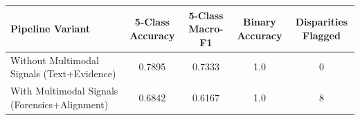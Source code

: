 \begin{tabular}{lcccc}
\hline
Pipeline Variant & 5-Class Accuracy & 5-Class Macro-F1 & Binary Accuracy & Disparities Flagged \\
\hline
Without Multimodal Signals (Text+Evidence) & 0.7895 & 0.7333 & 1.0 & 0 \\
With Multimodal Signals (Forensics+Alignment) & 0.6842 & 0.6167 & 1.0 & 8 \\
\hline
\end{tabular}
